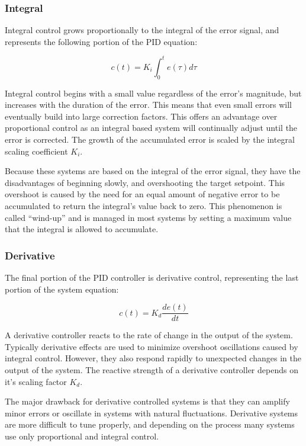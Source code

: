 \documentclass[openany,11pt,fleqn]{book} %
\begin{document}
\subsubsection{Integral}
Integral control grows proportionally to the integral of the error signal, and represents the following portion of the PID equation:

\begin{equation*}
c(t) = K_{i}\int_{0}^{t}e(\tau)d\tau
\end{equation*} 

Integral control begins with a small value regardless of the error's magnitude, but increases with the duration of the error. This means that even small errors will eventually build into large correction factors. This offers an advantage over proportional control as an integral based system will continually adjust until the error is corrected. The growth of the accumulated error is scaled by the integral scaling coefficient $ K_{i}$.

Because these systems are based on the integral of the error signal, they have the disadvantages of beginning slowly, and overshooting the target setpoint. This overshoot is caused by the need for an equal amount of negative error to be accumulated to return the integral's value back to zero. This phenomenon is called ``wind-up'' and is managed in most systems by setting a maximum value that the integral is allowed to accumulate. 

\subsubsection{Derivative}
The final portion of the PID controller is derivative control, representing the last portion of the system equation:

\begin{equation*}
c(t) = K_{d}\frac{de(t)}{dt}
\end{equation*} 

A derivative controller reacts to the rate of change in the output of the system. Typically derivative effects are used to minimize overshoot oscillations caused by integral control. However, they also respond rapidly to unexpected changes in the output of the system. The reactive strength of a derivative controller depends on it's scaling factor $K_{d}$.

The major drawback for derivative controlled systems is that they can amplify minor errors or oscillate in systems with natural fluctuations. Derivative systems are more difficult to tune properly, and depending on the process many systems use only proportional and integral control. 
\end{document}
